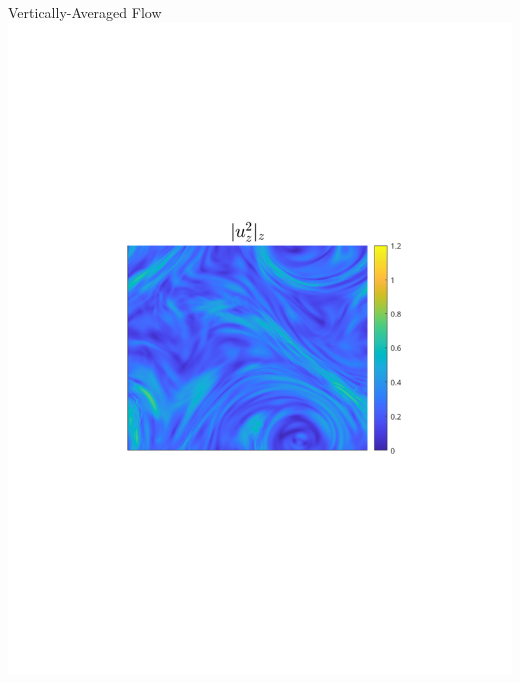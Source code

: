\documentclass{beamer}
\begin{document}
\begin{frame}{Vertically-Averaged Flow}
        \includegraphics[width=1\textwidth]{images/Om3B30_uzrms_bar.pdf}
    \emp

\end{frame}
\end{document}
